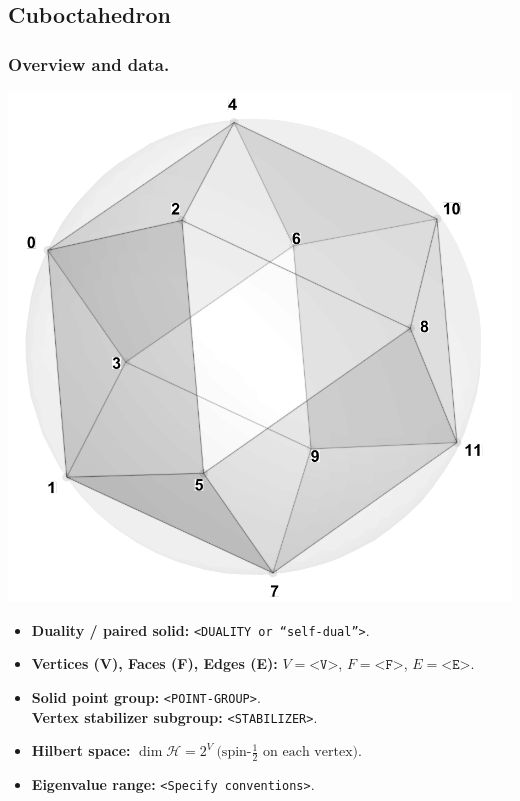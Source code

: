 \documentclass[11pt,a4paper]{article}
\begin{document}

\subsection*{Cuboctahedron}

\subsubsection*{Overview and data.}
\begin{center}
  \includegraphics[width=.6\linewidth]{cuboctahedron}
\end{center}

\begin{itemize}[leftmargin=1.5em]
  \item \textbf{Duality / paired solid:} \texttt{<DUALITY or “self-dual”>}.
  \item \textbf{Vertices (V), Faces (F), Edges (E):} $V=\texttt{<V>}$,\; $F=\texttt{<F>}$,\; $E=\texttt{<E>}$.
  \item \textbf{Solid point group:} \texttt{<POINT-GROUP>}.\\
        \textbf{Vertex stabilizer subgroup:} \texttt{<STABILIZER>}.
  \item \textbf{Hilbert space:} \(
        \dim\mathcal{H} = 2^{V}\ \text{(spin-$\tfrac12$ on each vertex).}
        \)
  \item \textbf{Eigenvalue range:} \texttt{<Specify conventions>}.
\end{itemize}
\end{document}
